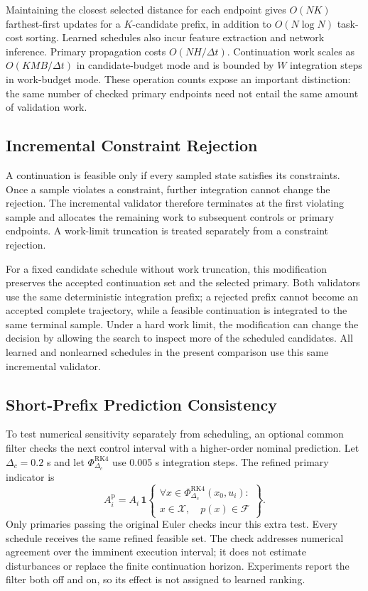 \documentclass[journal]{IEEEtran}
\begin{document}
Maintaining the closest selected distance for each endpoint gives $O(NK)$ farthest-first updates for a $K$-candidate prefix, in addition to $O(N\log N)$ task-cost sorting. Learned schedules also incur feature extraction and network inference. Primary propagation costs $O(NH/\Delta t)$. Continuation work scales as $O(KMB/\Delta t)$ in candidate-budget mode and is bounded by $W$ integration steps in work-budget mode. These operation counts expose an important distinction: the same number of checked primary endpoints need not entail the same amount of validation work.

\subsection{Incremental Constraint Rejection}
A continuation is feasible only if every sampled state satisfies its constraints. Once a sample violates a constraint, further integration cannot change the rejection. The incremental validator therefore terminates at the first violating sample and allocates the remaining work to subsequent controls or primary endpoints. A work-limit truncation is treated separately from a constraint rejection.

For a fixed candidate schedule without work truncation, this modification preserves the accepted continuation set and the selected primary. Both validators use the same deterministic integration prefix; a rejected prefix cannot become an accepted complete trajectory, while a feasible continuation is integrated to the same terminal sample. Under a hard work limit, the modification can change the decision by allowing the search to inspect more of the scheduled candidates. All learned and nonlearned schedules in the present comparison use this same incremental validator.

\subsection{Short-Prefix Prediction Consistency}
To test numerical sensitivity separately from scheduling, an optional common filter checks the next control interval with a higher-order nominal prediction. Let $\Delta_c=0.2$ s and let $\Phi^{\mathrm{RK4}}_{\Delta_c}$ use 0.005 s integration steps. The refined primary indicator is
\begin{equation}
 A_i^{\mathrm{p}}=A_i\,\mathbf 1\left\{\begin{array}{l}
 \forall x\in\Phi^{\mathrm{RK4}}_{\Delta_c}(x_0,u_i):\\
 x\in\mathcal X,\quad p(x)\in\mathcal F
 \end{array}\right\}.
\end{equation}
Only primaries passing the original Euler checks incur this extra test. Every schedule receives the same refined feasible set. The check addresses numerical agreement over the imminent execution interval; it does not estimate disturbances or replace the finite continuation horizon. Experiments report the filter both off and on, so its effect is not assigned to learned ranking.
\end{document}
